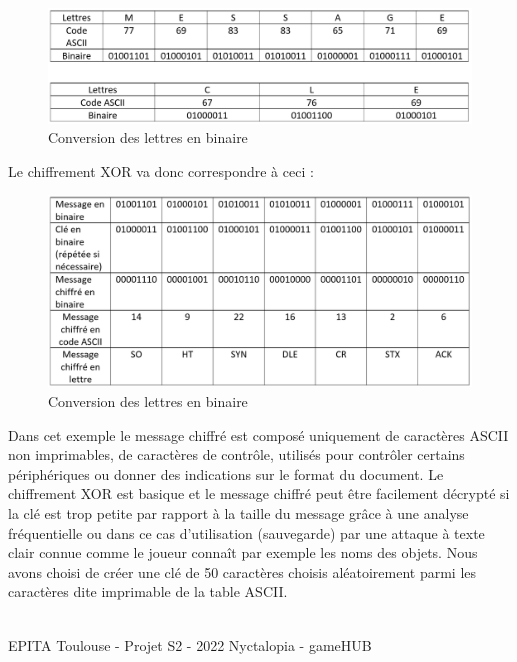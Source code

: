     \begin{figure}[H]
        \centering
        \includegraphics[width=15cm]{img/gameplay/clemsgtranscript.PNG}
        \caption{ Conversion des lettres en binaire}
        \label{fig:transciption}
    \end{figure}
    
Le chiffrement XOR va donc correspondre à ceci :
 \newline
    \begin{figure}[H]
        \centering
        \includegraphics[width=17cm]{img/gameplay/Xorencryot.PNG}
        \caption{ Conversion des lettres en binaire}
        \label{fig:XORencryption}
    \end{figure}

Dans cet exemple le message chiffré est composé uniquement de caractères ASCII non imprimables, de caractères de contrôle, utilisés pour contrôler certains périphériques ou donner des indications sur le format du document.
\newline
Le chiffrement XOR est basique et le message chiffré peut être facilement décrypté si la clé est trop petite par rapport à la taille du message grâce à une analyse fréquentielle ou dans ce cas d’utilisation (sauvegarde) par une attaque à texte clair connue comme le joueur connaît par exemple les noms des objets.
\newline
Nous avons choisi de créer une clé de 50 caractères choisis aléatoirement parmi les caractères dite imprimable de la table ASCII.

\vfill
\noindent\makebox[\linewidth]{\rule{.8\paperwidth}{.6pt}}\\[0.2cm]
EPITA Toulouse - Projet S2 - 2022 \hfill Nyctalopia - gameHUB
\noindent\makebox[\linewidth]{\rule{.8\paperwidth}{.6pt}}

